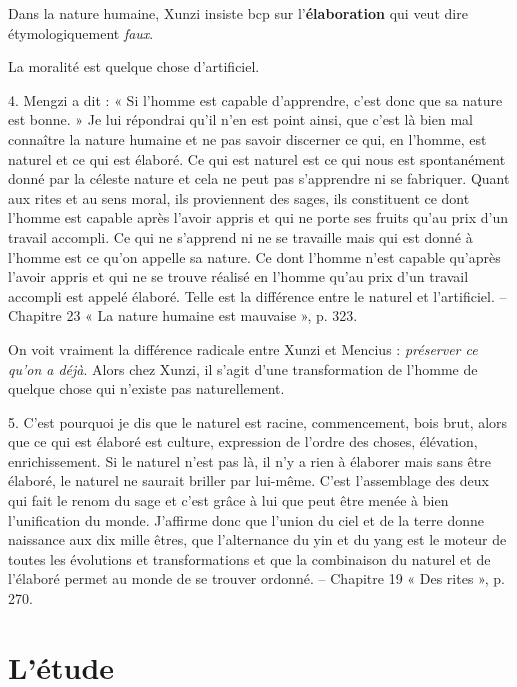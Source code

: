 Dans la nature humaine, Xunzi insiste bcp sur l'\textbf{élaboration} qui veut dire étymologiquement \textit{faux}. 

La moralité est quelque chose d'artificiel.

\begin{singlequote}
    4.	Mengzi a dit : « Si l’homme est capable d’apprendre, c’est donc que sa nature est bonne. » Je lui répondrai qu’il n’en est point ainsi, que c’est là bien mal connaître la nature humaine et ne pas savoir discerner ce qui, en l’homme, est naturel et ce qui est élaboré.
Ce qui est naturel est ce qui nous est spontanément donné par la céleste nature et cela ne peut pas s’apprendre ni se fabriquer. Quant aux rites et au sens moral, ils proviennent des sages, ils constituent ce dont l’homme est capable après l’avoir appris et qui ne porte ses fruits qu’au prix d’un travail accompli. Ce qui ne s’apprend ni ne se travaille mais qui est donné à l’homme est ce qu’on appelle sa nature. Ce dont l’homme n’est capable qu’après l’avoir appris et qui ne se trouve réalisé en l’homme qu’au prix d’un travail accompli est appelé élaboré. Telle est la différence entre le naturel et l’artificiel.
-- Chapitre 23 « La nature humaine est mauvaise », p. 323.


\end{singlequote}


On voit vraiment la différence radicale entre Xunzi et Mencius : \textit{préserver ce qu'on a déjà}. Alors chez Xunzi, il s'agit d'une transformation de l'homme de quelque chose qui n'existe pas naturellement. 


\begin{singlequote}
    5.	C’est pourquoi je dis que le naturel est racine, commencement, bois brut, alors que ce qui est élaboré est culture, expression de l’ordre des choses, élévation, enrichissement. Si le naturel n’est pas là, il n’y a rien à élaborer mais sans être élaboré, le naturel ne saurait briller par lui-même. C’est l’assemblage des deux qui fait le renom du sage et c’est grâce à lui que peut être menée à bien l’unification du monde. J’affirme donc que l’union du ciel et de la terre donne naissance aux dix mille êtres, que l’alternance du yin et du yang est le moteur de toutes les évolutions et transformations et que la combinaison du naturel et de l’élaboré permet au monde de se trouver ordonné.
-- Chapitre 19 « Des rites », p. 270.
\end{singlequote}

\section{L’étude}

